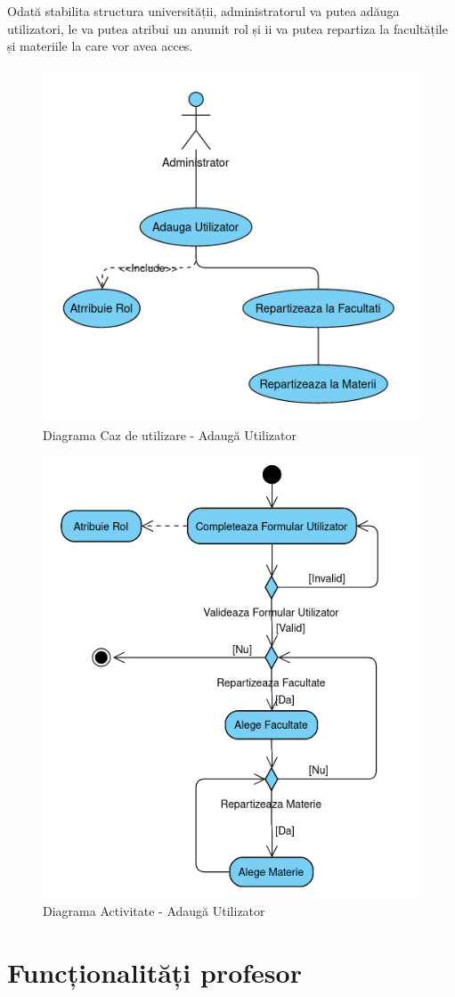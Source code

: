 \documentclass[12pt, a4paper, oneside, romanian]{teza-upb}
\begin{document}
Odată stabilita structura universității, administratorul va putea adăuga utilizatori, le va putea atribui un anumit rol și ii va putea repartiza la facultățile și materiile la care vor avea acces.

\begin{figure}[H]
\centering
\includegraphics*[width=0.525\columnwidth]{diagrama-use-case-adauga-utilizator}
\caption{Diagrama Caz de utilizare - Adaugă Utilizator}
\label{diagrama-use-case-adauga-utilizator}
\end{figure}


\begin{figure}[H]
\centering
\includegraphics*[width=0.6\columnwidth]{diagrama-activitate-adauga-utilizator}
\caption{Diagrama Activitate - Adaugă Utilizator}
\label{diagrama-activitate-adauga-utilizator}
\end{figure}

\section{Funcționalități profesor}
\end{document}
